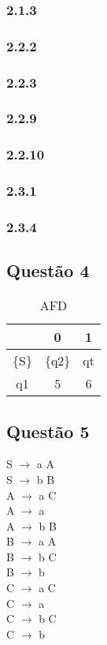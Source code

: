\documentclass{article}
\begin{document}
	\subsubsection{2.1.3}
	\subsubsection{2.2.2}
	\subsubsection{2.2.3}
	\subsubsection{2.2.9}
	\subsubsection{2.2.10}
	\subsubsection{2.3.1}
	\subsubsection{2.3.4}

	\subsection{Questão 4}
	
	
	\begin{table}[h]
		\centering
		\begin{tabular}{|c|c|c|}
			\hline
			  & 0 & 1 \\
			\hline
			\{S\} & \{q2\} & qt \\
			q1 & 5 & 6 \\
			\hline
		\end{tabular}
		\caption{AFD}
	\end{table}
	
	\subsection{Questão 5}
	
	S $\rightarrow$ a A \\
	S $\rightarrow$ b B \\
	A $\rightarrow$ a C \\
	A $\rightarrow$ a \\
	A $\rightarrow$ b B \\
	B $\rightarrow$ a A \\
	B $\rightarrow$ b C \\
	B $\rightarrow$ b \\
	C $\rightarrow$ a C \\
	C $\rightarrow$ a \\
	C $\rightarrow$ b C \\
	C $\rightarrow$ b \\
	
	

	
\end{document}
